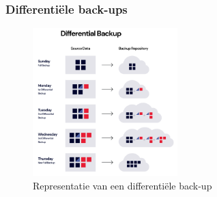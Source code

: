 \subsubsection{Differentiële back-ups}
\begin{figure}[h]
    \centering
    \captionsetup{justification=centering}
    \includegraphics[width=0.5\textwidth]{img/diff.png}  
    \caption{Representatie van een differentiële back-up \autocite{Rivas2022}}   
    \label{fig:diffrback-up}           
\end{figure}
